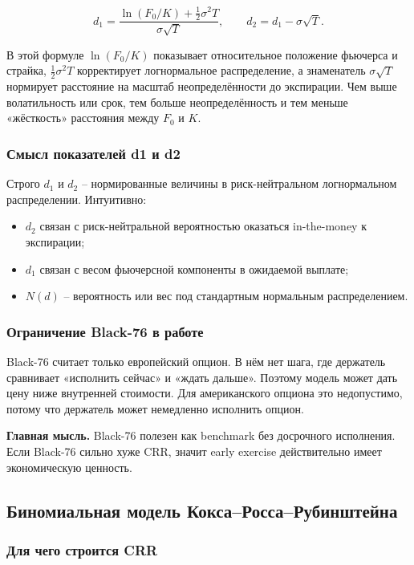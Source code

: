 \documentclass[11pt,a4paper]{article}
\newcommand{\key}[1]{%
  \vspace{0.15em}
  \noindent\colorbox{softblue}{%
    \parbox{\dimexpr\linewidth-2\fboxsep\relax}{\textbf{Главная мысль.} #1}%
  }\vspace{0.2em}
}
\begin{document}
\begin{equation}
d_1 =
\frac{\ln(F_0/K)+\frac{1}{2}\sigma^2T}
{\sigma\sqrt{T}},
\qquad
d_2=d_1-\sigma\sqrt{T}.
\end{equation}

В этой формуле $\ln(F_0/K)$ показывает относительное положение фьючерса и страйка, $\frac{1}{2}\sigma^2T$ корректирует логнормальное распределение, а знаменатель $\sigma\sqrt{T}$ нормирует расстояние на масштаб неопределённости до экспирации. Чем выше волатильность или срок, тем больше неопределённость и тем меньше «жёсткость» расстояния между $F_0$ и $K$.

\subsubsection{Смысл показателей d1 и d2}

Строго $d_1$ и $d_2$ -- нормированные величины в риск-нейтральном логнормальном распределении. Интуитивно:

\begin{itemize}
    \item $d_2$ связан с риск-нейтральной вероятностью оказаться in-the-money к экспирации;
    \item $d_1$ связан с весом фьючерсной компоненты в ожидаемой выплате;
    \item $N(d)$ -- вероятность или вес под стандартным нормальным распределением.
\end{itemize}

\subsubsection{Ограничение Black-76 в работе}

Black-76 считает только европейский опцион. В нём нет шага, где держатель сравнивает «исполнить сейчас» и «ждать дальше». Поэтому модель может дать цену ниже внутренней стоимости. Для американского опциона это недопустимо, потому что держатель может немедленно исполнить опцион.

\key{Black-76 полезен как benchmark без досрочного исполнения. Если Black-76 сильно хуже CRR, значит early exercise действительно имеет экономическую ценность.}

\subsection{Биномиальная модель Кокса--Росса--Рубинштейна}

\subsubsection{Для чего строится CRR}
\end{document}

